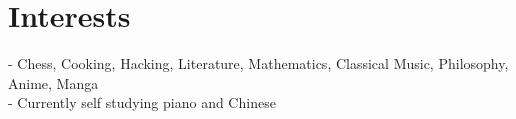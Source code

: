 \section*{Interests}
- Chess, Cooking, Hacking, Literature, Mathematics, Classical Music,
Philosophy, Anime, Manga \\
- Currently self studying piano and Chinese

